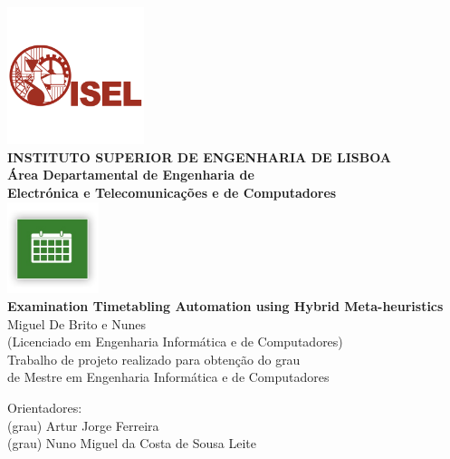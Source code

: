 \begin{titlepage}
	\thispagestyle{empty}
	\begin{center}
		\includegraphics[width=0.3\textwidth,natwidth=720,natheight=434]{./images/isellogo.png} \\[0.5cm]
		{\Large \textbf{INSTITUTO SUPERIOR DE ENGENHARIA DE LISBOA}} \\[0.5cm]
		{\Large \textbf{Área Departamental de Engenharia de \\Electrónica e Telecomunica\c cões e de Computadores}} \\[0.8cm]		
		\includegraphics[width=0.2\textwidth,natwidth=300,natheight=300]{./images/timetable.jpg} \\[0.8cm]
		\fontsize{18pt}{10pt}\selectfont
		{\textbf{Examination Timetabling Automation using Hybrid Meta-heuristics}} \\[0.8cm]
		\fontsize{16pt}{10pt}\selectfont
		Miguel De Brito e Nunes\\[0.2cm]
		\fontsize{14pt}{10pt}\selectfont
		(Licenciado em Engenharia Informática e de Computadores)\\[0.8cm]
		\fontsize{12pt}{10pt}\selectfont
		{Trabalho de projeto realizado para obten\c cão do grau\\de Mestre em Engenharia Informática e de Computadores} \\[0.8cm]
		\fontsize{16pt}{10pt}\selectfont
		\vfill
		\begin{tabbing}
		   \fontsize{12pt}{10pt}\selectfont
		   Orientadores: \\
		   \fontsize{11pt}{10pt}\selectfont
		   \hspace{1.1cm}(grau) Artur Jorge Ferreira \\
		   \fontsize{11pt}{10pt}\selectfont
		   \hspace{1.1cm}(grau) Nuno Miguel da Costa de Sousa Leite \\

\end{tabbing}
\end{center}
\end{titlepage}
